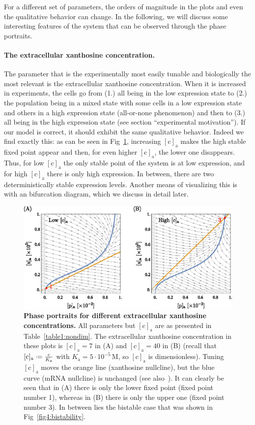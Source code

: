 \documentclass[10pt,letterpaper]{article}
\newcommand{\unit}[1]{\,\mathrm{#1}}
\newcommand{\n}[1]{\mathrm{#1}}
\newcommand*{\defeq}{\mathrel{\vcenter{\baselineskip0.5ex \lineskiplimit0pt
			\hbox{\scriptsize.}\hbox{\scriptsize.}}}%
	=}
\begin{document}
	For a different set of parameters, the orders of magnitude in the plots and
	even the qualitative behavior can change. In the following, we will discuss
	some interesting features of the system that can be observed through the
	phase portraits. 
	
	\paragraph*{The extracellular xanthosine concentration.}
	The parameter that is the experimentally most easily tunable and
	biologically the most relevant is the extracellular xanthosine
	concentration. When it is increased in experiments, the cells go from (1.) all
	being in the low expression state to (2.) the population being in a mixed state with some cells in a low expression state and others in a high expression state (all-or-none phenomenon) and then to (3.) all being in the high
	expression state (see section ``experimental motivation''). If our model is correct, it should
	exhibit the same qualitative behavior. Indeed we find exactly this: as can
	be seen in Fig~\ref{fig5:extraxanth}, increasing $\n{[c]_a}$ makes the high
	stable fixed point appear and then, for even higher $\n{[c]_a}$, the lower
	one disappears. Thus, for low $\n{[c]_a}$ the only stable point of the system
	is at low expression, and for high $\n{[c]_a}$ there is only high
	expression. In between, there are two deterministically stable expression
	levels. Another means of visualizing this is with an bifurcation diagram, which we discuss in detail later.
	
	\begin{figure}%
		\centering
		\includegraphics{media/Fig5_extraxanth.eps}
		\caption{{\bf Phase portraits for different extracellular xanthosine concentrations.}
			All parameters but $\n{[c]_a}$ are as presented in
			Table~\ref{table1:nondim}. The extracellular xanthosine
			concentration in these plots is $\n{[c]_a}=7$ in (A) and
			$\n{[c]_a}= 40$ in (B) (recall that $\n{[c]_{a}} \defeq
			\frac{c}{K_{\n{a}}}$ with $K_{\n{a}} = 5 \cdot 10^{-5} \unit{M}$,
			so $\n{[c]_a}$ is dimensionless).
			Tuning $\n{[c]_a}$ moves the orange line (xanthosine nullcline), but the blue curve (mRNA nullcline) is unchanged (see
			also~). It can clearly be seen that in (A) there is
			only the lower fixed point (fixed point number 1), whereas in (B)
			there is only the upper one (fixed point number 3). In between lies
			the bistable case that was shown in Fig~\ref{fig4:bistability}.}
		\label{fig5:extraxanth}
	\end{figure}
	
\end{document}
